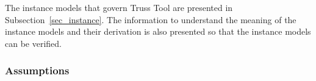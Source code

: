 \documentclass[12pt]{article}
\begin{document}





The instance models that govern Truss Tool are presented in
Subsection~\ref{sec_instance}.  The information to understand the meaning of the instance models and their derivation is also presented so that the instance models can be verified.

\subsubsection{Assumptions} \label{sec_assumpt}

\end{document}
